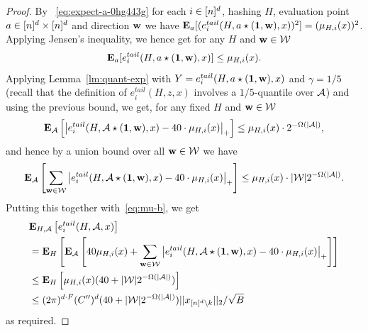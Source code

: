 \begin{proof}
By ~\eqref{eq:expect-a-0hg443g} for each $i\in {[n]^d}$, hashing $H$, evaluation point $a\in {[n]^d}\times {[n]^d}$ and direction $\mathbf{w}$ we have
${\bf \mbox{\bf E}}_a[(e^{tail}_i(H, a\star (\mathbf{1},  \mathbf{w}), x))^2]=(\mu_{H, i}(x))^2$. Applying Jensen's inequality, we hence get for any $H$ and $\mathbf{w}\in \mathcal{W}$
\begin{equation}
{\bf \mbox{\bf E}}_a[e^{tail}_{i}(H, a\star (\mathbf{1}, \mathbf{w}), x)]\leq \mu_{H, i}(x).
\end{equation}
 Applying Lemma~\ref{lm:quant-exp} with $Y=e^{tail}_{i}(H, a\star (\mathbf{1}, \mathbf{w}), x)$ and $\gamma=1/5$ (recall that the definition of $e^{tail}_i(H, z, x)$ involves a $1/5$-quantile over ${\mathcal{A}}$) and using the previous bound, we get, for any fixed $H$ and $\mathbf{w}\in \mathcal{W}$
\begin{equation}\label{eq:e-b-exp}
{\bf \mbox{\bf E}}_{\mathcal{A}}\left[\left|e^{tail}_{i}(H, {\mathcal{A}}\star (\mathbf{1}, \mathbf{w}), x)-40\cdot \mu_{H, i}(x)\right|_+\right]\leq \mu_{H, i}(x)\cdot 2^{-\Omega(|{\mathcal{A}}|)},
\end{equation}
and hence by a union bound over all $\mathbf{w}\in \mathcal{W}$ we have 
\begin{equation*}
{\bf \mbox{\bf E}}_{\mathcal{A}}\left[\sum_{\mathbf{w}\in \mathcal{W}}\left|e^{tail}_{i}(H, {\mathcal{A}}\star (\mathbf{1}, \mathbf{w}), x)-40\cdot \mu_{H, i}(x)\right|_+\right]\leq \mu_{H, i}(x)\cdot |\mathcal{W}|2^{-\Omega(|{\mathcal{A}}|)}.
\end{equation*}
Putting this together with~\eqref{eq:mu-b}, we get 
\begin{equation*}
\begin{split}
&{\bf \mbox{\bf E}}_{H, {\mathcal{A}}}\left[e^{tail}_i(H, {\mathcal{A}}, x)\right]\\
&={\bf \mbox{\bf E}}_H\left[{\bf \mbox{\bf E}}_{\mathcal{A}}\left[40\mu_{H, i}(x)+\sum_{\mathbf{w}\in \mathcal{W}}\left|e^{tail}_{i}(H, {\mathcal{A}}\star (\mathbf{1}, \mathbf{w}), x)-40\cdot \mu_{H, i}(x)\right|_+\right]\right]\\
&\leq{\bf \mbox{\bf E}}_H\left[\mu_{H, i}(x)(40+|\mathcal{W}|2^{-\Omega(|{\mathcal{A}}|)})\right]\\
&\leq (2\pi)^{d\cdot F} (C'')^d (40+|\mathcal{W}|2^{-\Omega(|{\mathcal{A}}|)}) ||x_{{[n]^d} \setminus k}||_2/\sqrt{B}
\end{split}
\end{equation*}
as required.
\end{proof}


